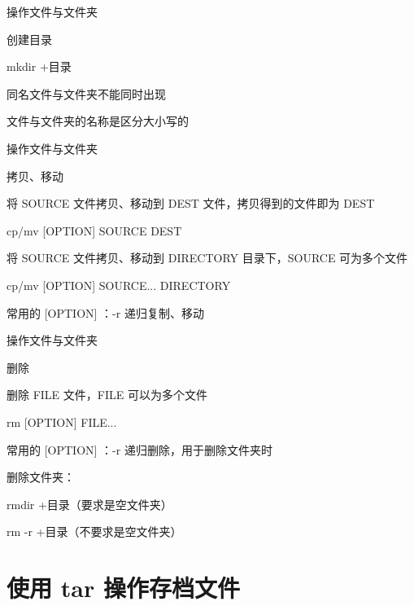 \documentclass[UTF8]{ctexbeamer}
\begin{document}
\begin{frame}{操作文件与文件夹}

    创建目录

    mkdir +目录

    同名文件与文件夹不能同时出现

    文件与文件夹的名称是区分大小写的

\end{frame}

\begin{frame}{操作文件与文件夹}

    拷贝、移动

    将 SOURCE 文件拷贝、移动到 DEST 文件，拷贝得到的文件即为 DEST

    cp/mv [OPTION] SOURCE DEST

    将 SOURCE 文件拷贝、移动到 DIRECTORY 目录下，SOURCE 可为多个文件

    cp/mv [OPTION] SOURCE... DIRECTORY

    常用的 [OPTION] ：-r 递归复制、移动

\end{frame}

\begin{frame}{操作文件与文件夹}

    删除

    删除 FILE 文件，FILE 可以为多个文件

    rm [OPTION] FILE...

    常用的 [OPTION] ：-r 递归删除，用于删除文件夹时

    删除文件夹：

    rmdir +目录（要求是空文件夹）

    rm -r +目录（不要求是空文件夹）

\end{frame}
\section{使用 tar 操作存档文件}
\end{document}
